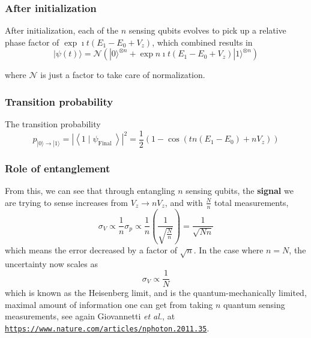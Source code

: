 \documentclass{beamer}
\begin{document}
\begin{frame}
\frametitle{After initialization}

After initialization, each of the $n$ sensing qubits evolves to pick up a relative phase factor of $\exp{\imath t\left(E_{1}-E_{0}+ V_z\right)}$, which combined results in
\[
|\psi(t)\rangle=\mathcal{N}\left(|0\rangle^{\otimes n}+\exp{n \imath t\left(E_{1}-E_{0}+ V_z\right)}|1\rangle^{\otimes n}\right)
\]

where $\mathcal{N}$ is just a factor to take care of normalization.
\end{frame}

\begin{frame}
\frametitle{Transition probability}

The transition probability
\[
p_{|0\rangle \rightarrow|1\rangle}=\left|\left\langle 1 \mid \psi_{\text {Final }}\right\rangle\right|^{2}=\frac{1}{2}\left(1-\cos \left(t n\left(E_{1}-E_{0}\right)+n  V_z\right)\right)
\]
\end{frame}

\begin{frame}
\frametitle{Role of entanglement}

From this, we can see that through entangling $n$ sensing qubits, the
\textbf{signal} we are trying to sense increases from $V_z \rightarrow n
V_z$, and with $\frac{N}{n}$ total measurements,
\[
\sigma_{V} \propto \frac{1}{n} \sigma_{p} \propto \frac{1}{n}\left(\frac{1}{\sqrt{\frac{N}{n}}}\right)=\frac{1}{\sqrt{N n}}
\]
which means the error decreased by a factor of $\sqrt{n}$. In the case where $n=N$, the uncertainty now scales as
\[
\sigma_{V} \propto \frac{1}{N}
\]
which is known as the Heisenberg limit, and is the
quantum-mechanically limited, maximal amount of information one can
get from taking $n$ quantum sensing measurements, see again Giovannetti \emph{et al.}, at \href{{https://www.nature.com/articles/nphoton.2011.35}}{\nolinkurl{https://www.nature.com/articles/nphoton.2011.35}}.
\end{frame}
\end{document}
